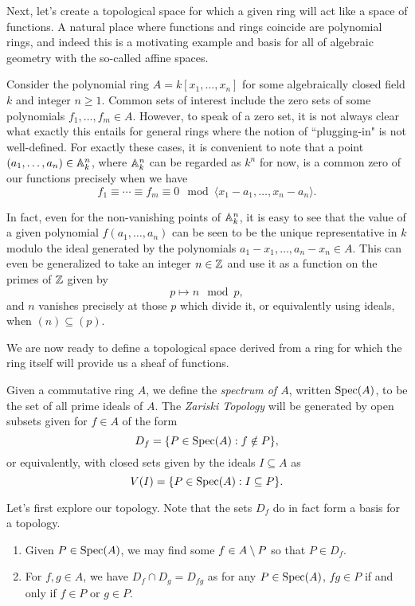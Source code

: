 Next, let's create a topological space for which a given ring will act like a space of functions.
A natural place where functions and rings coincide are polynomial rings,
and indeed this is a motivating example and basis for all of algebraic geometry with the so-called affine spaces.

Consider the polynomial ring $A = k[x_1, \ldots, x_n]$ for some algebraically closed field $k$ and integer $n \geq 1$.
Common sets of interest include the zero sets of some polynomials $f_1, \ldots, f_m \in A$.
However, to speak of a zero set, it is not always clear what exactly this entails for general rings where the notion of ``plugging-in" is not well-defined.
For exactly these cases, it is convenient to note that a point ${(a_1, \ldots, a_n) \in \mathbb{A}_k^n}$,
where $\mathbb{A}_k^n$ can be regarded as $k^n$ for now,
is a common zero of our functions precisely when we have
\[
    f_1 \equiv \cdots \equiv f_m \equiv 0  \mod \langle x_1 - a_1, \ldots, x_n - a_n \rangle.
\]

In fact, even for the non-vanishing points of $\mathbb{A}_k^n$, 
it is easy to see that the value of a given polynomial $f(a_1, \ldots, a_n)$ can be seen to be the unique representative in $k$ modulo the ideal generated by the polynomials $a_1 - x_1, \ldots, a_n - x_n \in A$. 
This can even be generalized to take an integer $n \in \mathbb{Z}$ and use it as a function on the primes of $\mathbb{Z}$ given by
\[
    p \mapsto n \mod p,
\]
and $n$ vanishes precisely at those $p$ which divide it,
or equivalently using ideals, when ${(n) \subseteq (p)}$. 

We are now ready to define a topological space derived from a ring for which the ring itself will provide us a sheaf of functions.

\begin{definition}
    Given a commutative ring $A$, we define the \textit{spectrum of $A$}, written ${\rm Spec}(A)$, to be the set of all prime ideals of $A$.
    The \textit{Zariski Topology} will be generated by open subsets given for $f \in A$ of the form
    \[
        D_f = \{ P \in {\rm Spec}(A) : f \notin P \},
    \]
    or equivalently, with closed sets given by the ideals $I \subseteq A$ as
    \[
        V(I) = \{ P \in {\rm Spec}(A) : I \subseteq P \}.
    \]
\end{definition}

Let's first explore our topology.
Note that the sets $D_f$ do in fact form a basis for a topology.
\begin{enumerate}
    \item Given $P \in {\rm Spec}(A)$, 
    we may find some $f \in A \setminus P$ so that $P \in D_f$.
    \item For $f, g \in A$, we have $D_f \cap D_g = D_{f g}$ as for any $P \in {\rm Spec}(A)$, 
    $f g \in P$ if and only if $f \in P$ or $g \in P$.
\end{enumerate}

